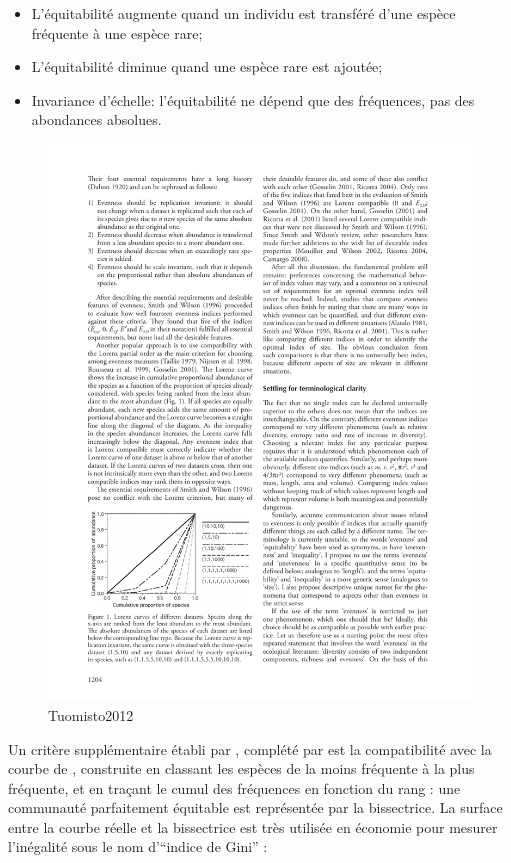 \documentclass[
  11pt,
  french,
  a4paper,
  extrafontsizes,onecolumn,openright
  ]{memoir}
\providecommand{\tightlist}{%
  \setlength{\itemsep}{0pt}\setlength{\parskip}{0pt}}
\begin{document}
\begin{itemize}
\tightlist
\item
  L'équitabilité augmente quand un individu est transféré d'une espèce fréquente à une espèce rare;
\item
  L'équitabilité diminue quand une espèce rare est ajoutée;
\item
  Invariance d'échelle: l'équitabilité ne dépend que des fréquences, pas des abondances absolues.
\end{itemize}



\scriptsize

\begin{figure}

{\centering \includegraphics[width=0.8\linewidth]{images/Tuomisto2012} 

}

\caption{Tuomisto2012}\label{fig:Tuomisto2012}
\end{figure}

\normalsize

Un critère supplémentaire établi par \textcite{Smith1996}, complété par \textcite{Gosselin2001} est la compatibilité avec la courbe de \textcite{Lorenz1905}, construite en classant les espèces de la moins fréquente à la plus fréquente, et en traçant le cumul des fréquences en fonction du rang \autocite[figure \ref{fig:Tuomisto2012},][]{Tuomisto2012}: une communauté parfaitement équitable est représentée par la bissectrice.
La surface entre la courbe réelle et la bissectrice est très utilisée en économie pour mesurer l'inégalité sous le nom d'``indice de Gini'' \autocite{Gini1912,Ceriani2012}:
\end{document}
